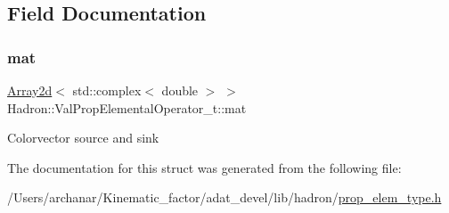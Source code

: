 \subsection{Field Documentation}
\mbox{\label{structHadron_1_1ValPropElementalOperator__t_aee3c0c872145b334c5ee5dbd0f2e0f2d}} 
\subsubsection{\texorpdfstring{mat}{mat}}
{\footnotesize\ttfamily \mbox{\hyperlink{classXMLArray_1_1Array2d}{Array2d}}$<$ std\+::complex$<$ double $>$ $>$ Hadron\+::\+Val\+Prop\+Elemental\+Operator\+\_\+t\+::mat}

Colorvector source and sink 

The documentation for this struct was generated from the following file\+:\begin{DoxyCompactItemize}
\item 
/\+Users/archanar/\+Kinematic\+\_\+factor/adat\+\_\+devel/lib/hadron/\mbox{\hyperlink{lib_2hadron_2prop__elem__type_8h}{prop\+\_\+elem\+\_\+type.\+h}}\end{DoxyCompactItemize}
